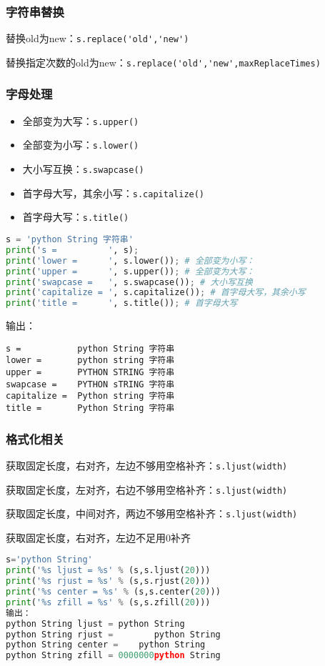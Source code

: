 \subsubsection{字符串替换}

替换old为new：\verb|s.replace('old','new')|

替换指定次数的old为new：\verb|s.replace('old','new',maxReplaceTimes)|


\subsubsection{字母处理}
\begin{itemize}
\item 全部变为大写：\verb|s.upper()|
\item 全部变为小写：\verb|s.lower()|
\item 大小写互换：\verb|s.swapcase()|
\item 首字母大写，其余小写：\verb|s.capitalize()|
\item 首字母大写：\verb|s.title()|
\end{itemize}

\begin{lstlisting}[language=python]
s = 'python String 字符串'
print('s =          ', s);
print('lower =      ', s.lower()); # 全部变为小写：
print('upper =      ', s.upper()); # 全部变为大写：
print('swapcase =   ', s.swapcase()); # 大小写互换
print('capitalize = ', s.capitalize()); # 首字母大写，其余小写
print('title =      ', s.title()); # 首字母大写
\end{lstlisting}
输出：
\begin{lstlisting}
s =           python String 字符串
lower =       python string 字符串
upper =       PYTHON STRING 字符串
swapcase =    PYTHON sTRING 字符串
capitalize =  Python string 字符串
title =       Python String 字符串
\end{lstlisting}

\subsubsection{格式化相关}
获取固定长度，右对齐，左边不够用空格补齐：\verb|s.ljust(width)|

获取固定长度，左对齐，右边不够用空格补齐：\verb|s.ljust(width)|

获取固定长度，中间对齐，两边不够用空格补齐：\verb|s.ljust(width)|

获取固定长度，右对齐，左边不足用0补齐

\begin{lstlisting}[language=python]
s='python String'
print('%s ljust = %s' % (s,s.ljust(20)))
print('%s rjust = %s' % (s,s.rjust(20)))
print('%s center = %s' % (s,s.center(20)))
print('%s zfill = %s' % (s,s.zfill(20)))
输出：
python String ljust = python String       
python String rjust =        python String
python String center =    python String    
python String zfill = 0000000python String
\end{lstlisting}

